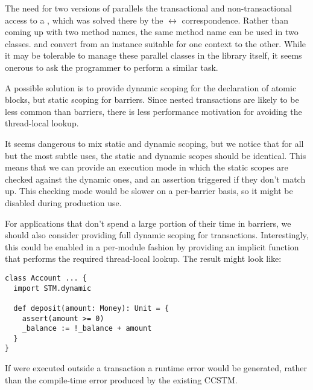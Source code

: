 The need for two versions of  parallels the transactional and
non-transactional access to a , which was solved there by the
 $\leftrightarrow$  correspondence.  Rather than
coming up with two method names, the same method name can be used in
two classes.   and 
convert from an instance suitable for one context to the other.  While it
may be tolerable to manage these parallel classes in the library itself,
it seems onerous to ask the programmer to perform a similar task.

A possible solution is to provide dynamic scoping for the declaration
of atomic blocks, but static scoping for barriers.  Since nested
transactions are likely to be less common than barriers, there is less
performance motivation for avoiding the thread-local lookup.

It seems dangerous to mix static and dynamic scoping, but we notice that
for all but the most subtle uses, the static and dynamic scopes should be
identical.  This means that we can provide an execution mode in which the
static scopes are checked against the dynamic ones, and an assertion triggered
if they don't match up.  This checking mode would be slower on a per-barrier
basis, so it might be disabled during production use.

For applications that don't spend a large portion of their time in barriers, we
should also consider providing full dynamic scoping for transactions.
Interestingly, this could be enabled in a per-module fashion by providing an
implicit function that performs the required thread-local lookup.  The result
might look like:
\lstset{numbers=none}
\begin{lstlisting}
class Account ... {
  import STM.dynamic

  def deposit(amount: Money): Unit = {
    assert(amount >= 0)
    _balance := !_balance + amount
  }
}
\end{lstlisting}
\lstset{numbers=left}
If  were executed outside a transaction a runtime error would be
generated, rather than the compile-time error produced by the existing CCSTM.

